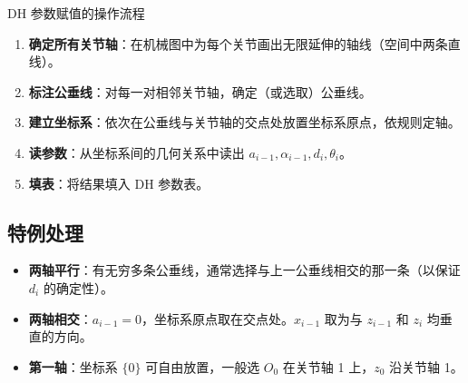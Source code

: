 \begin{myTheorem}{DH 参数赋值的操作流程}
	\begin{enumerate}
		\item \textbf{确定所有关节轴}：在机械图中为每个关节画出无限延伸的轴线（空间中两条直线）。
		\item \textbf{标注公垂线}：对每一对相邻关节轴，确定（或选取）公垂线。
		\item \textbf{建立坐标系}：依次在公垂线与关节轴的交点处放置坐标系原点，依规则定轴。
		\item \textbf{读参数}：从坐标系间的几何关系中读出 $a_{i-1}, \alpha_{i-1}, d_i, \theta_i$。
		\item \textbf{填表}：将结果填入 DH 参数表。
	\end{enumerate}
\end{myTheorem}

\subsection{特例处理}

\begin{itemize}
	\item \textbf{两轴平行}：有无穷多条公垂线，通常选择与上一公垂线相交的那一条（以保证 $d_i$ 的确定性）。
	\item \textbf{两轴相交}：$a_{i-1}=0$，坐标系原点取在交点处。$x_{i-1}$ 取为与 $z_{i-1}$ 和 $z_i$ 均垂直的方向。
	\item \textbf{第一轴}：坐标系 $\{0\}$ 可自由放置，一般选 $O_0$ 在关节轴 1 上，$z_0$ 沿关节轴 1。
\end{itemize}
